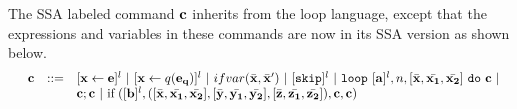 The SSA labeled command ${\bf{{c}}}$ inherits from the {loop} language, except that the expressions and variables in these commands are now in its SSA version as shown below. 
\[
\begin{array}{llll}
 & \ssa{c} & ::= &   [\assign {\ssa{x}}{ \ssa{\expr}}]^{l} ~|~  [\assign {{\ssa{x}} } {q({\ssa{e_q}})}]^{l}
%
~|~  {{ifvar(\bar{\ssa{x}}, \bar{\ssa{x}}')}}  ~|~ [\eskip]^{l}  ~|~
 \eloop ~ [{\ssa{\aexpr}}]^{l}, {n},  [\bar{\ssa{x}}, \bar{\ssa{x_1}}, \bar{\ssa{x_2}}] ~ \edo ~ {\ssa{c}}  ~|~ \\ &&& \ssa{c};\ssa{c}  ~|~  \eif([\ssa{\bexpr}]^{l}, ([\bar{\ssa{x}}, \bar{\ssa{x_1}}, \bar{\ssa{x_2}}] , [\bar{\ssa{y}}, \bar{\ssa{y_1}}, \bar{\ssa{y_2}}],[\bar{\ssa{z}}, \bar{\ssa{z_1}}, \bar{\ssa{z_2}}] ) , \ssa{c}, \ssa{c}) 	
	\\
%
\end{array}
\]
